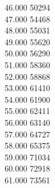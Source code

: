 { 46.000	50294 \\
 47.000	54468 \\
 48.000	55031 \\
 49.000	55620 \\
 50.000	56290 \\
 51.000	58360 \\
 52.000	58868 \\
 53.000	61410 \\
 54.000	61900 \\
 55.000	62411 \\
 56.000	63140 \\
 57.000	64727 \\
 58.000	65375 \\
 59.000	71034 \\
 60.000	72918 \\
 61.000	73561 \\
}
